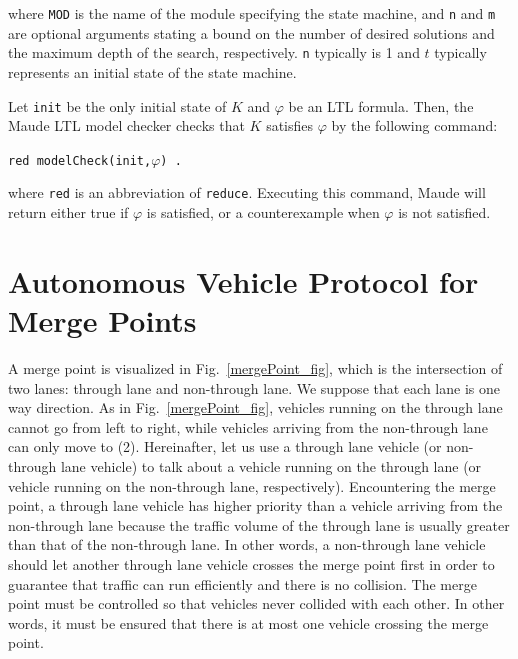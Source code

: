 \documentclass[10pt, conference, compsocconf]{IEEEtran}
\begin{document}
\noindent
where \verb!MOD! is the name of the module specifying the state
machine, and \verb!n! and \verb!m! are optional arguments stating a
bound on the number of desired solutions and the maximum depth of the
search, respectively.  \verb!n! typically is 1 and $t$ typically
represents an initial state of the state machine.

 Let \verb!init! be the only initial state of $K$ and $\varphi$ be an LTL
 formula. Then, the Maude LTL model checker checks that
 $K$ satisfies $\varphi$ by the following command:
 
 \smallskip
 \begin{small}
 	\noindent
 	\verb!red modelCheck(init,!$\varphi$\verb!) .!
 \end{small}
 \smallskip
 
 \noindent
 where \verb!red! is an abbreviation of \verb!reduce!. 
 Executing this command, Maude will return either true if $\varphi$ is satisfied, or a counterexample when $\varphi$ is not satisfied.


 
\section{Autonomous Vehicle Protocol for Merge Points}
 \label{sect_oriproto}
A merge point is visualized in Fig.~\ref{mergePoint_fig}, which is the intersection of two lanes: through lane and non-through lane.
We suppose that each lane is one way direction.
As in Fig.~\ref{mergePoint_fig}, vehicles running on the through lane cannot go from left to right, while vehicles arriving from the non-through lane can only move to (2).
Hereinafter, let us use a through lane vehicle (or non-through lane vehicle) to talk about a vehicle running on the through lane (or vehicle running on the non-through lane, respectively). 
Encountering the merge point, a through lane vehicle has higher priority than a vehicle arriving from the non-through lane because the traffic volume of the through lane is usually greater than that of the non-through lane. 
In other words, a non-through lane vehicle should let another through lane vehicle crosses the merge point first in order to guarantee that traffic can run efficiently and there is no collision.
The merge point must be controlled so that vehicles never collided with each other. 
In other words, it must be ensured that there is at most one vehicle crossing the merge point.
\end{document}
